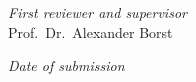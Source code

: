 \hfill

\vfill

\textit{First reviewer and supervisor} \\
Prof.\ Dr.\ Alexander Borst

\bigskip



\textit{Date of submission} \\
\myTime


